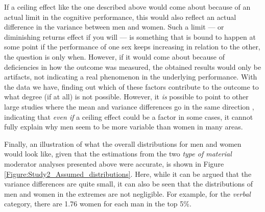 If a ceiling effect like the one described above would come about because of an actual limit in the cognitive performance, this would also reflect an actual difference in the variance between men and women. Such a limit --- or diminishing returns effect if you will --- is something that is bound to happen at some point if the performance of one sex keeps increasing in relation to the other, the question is only when. However, if it would come about because of deficiencies in how the outcome was measured, the obtained results would only be artifacts, not indicating a real phenomenon in the underlying performance. With the data we have, finding out which of these factors contribute to the outcome to what degree (if at all) is not possible. However, it \emph{is} possible to point to other large studies where the mean and variance differences go in the same direction \parencite{Hedges1995, Machin2008, Nowell1998, Lakin2013}, indicating that \emph{even if} a ceiling effect could be a factor in some cases, it cannot fully explain why men seem to be more variable than women in many areas.

Finally, an illustration of what the overall distributions for men and women would look like, given that the estimations from the two \emph{type of material} moderator analyses presented above were accurate, is shown in Figure \ref{Figure:Study2_Assumed_distributions}. Here, while it can be argued that the variance differences are quite small, it can also be seen that the distributions of men and women in the extremes are not negligible. For example, for the \emph{verbal} category, there are 1.76 women for each man in the top 5\%.

